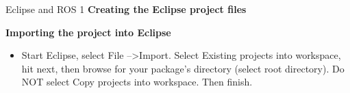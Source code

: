 \documentclass{beamer}
\begin{document}
\begin{frame}{Eclipse and ROS 1}
 \textbf{Creating the Eclipse project files}
  
 \vspace{5mm}
 \textbf{Importing the project into Eclipse}
 \begin{itemize}
 \item Start Eclipse, select File  --\textgreater  Import. Select  Existing projects into workspace, hit next, then browse for your package's directory (select root directory). Do NOT select Copy projects into workspace. Then finish.
 \end{itemize}
\end{frame}
\end{document}
